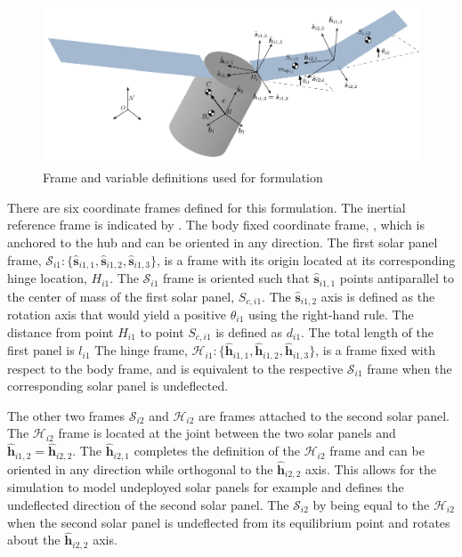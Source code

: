 \documentclass[paper]{aiaaNew}
\begin{document}
	\begin{figure}
		\centering
		\includegraphics[]{Figures/Flex_Slosh_Figure}
		\caption{Frame and variable definitions used for formulation}
		\label{fig:Flex_Slosh_Figure}
	\end{figure} 
	
	There are six coordinate frames defined for this formulation. The inertial reference frame is indicated by . The body fixed coordinate frame, , which is anchored to the hub and can be oriented in any direction. The first solar panel frame, $\mathcal{S}_{i1}:\{\hat{\bm s}_{i1,1},\hat{\bm s}_{i1,2},\hat{\bm s}_{i1,3}\}$, is a frame with its origin located at its corresponding hinge location, $H_{i1}$. The $\mathcal{S}_{i1}$ frame is oriented such that $\hat{\bm{s}}_{i1,1}$ points antiparallel to the center of mass of the first solar panel, $S_{c,i1}$. The $\hat{\bm{s}}_{i1,2}$ axis is defined as the rotation axis that would yield a positive $\theta_{i1}$ using the right-hand rule. The distance from point $H_{i1}$ to point $S_{c,i1}$ is defined as $d_{i1}$. The total length of the first panel is $l_{i1}$ The hinge frame, $\mathcal{H}_{i1}:\{\hat{\bm h}_{i1,1}, \hat{\bm h}_{i1,2}, \hat{\bm h}_{i1,3} \}$, is a frame fixed with respect to the body frame, and is equivalent to the respective $\mathcal{S}_{i1}$ frame when the corresponding solar panel is undeflected.

	The other two frames $\mathcal{S}_{i2}$ and $\mathcal{H}_{i2}$ are frames attached to the second solar panel. The $\mathcal{H}_{i2}$ frame is located at the joint between the two solar panels and $\hat{\bm h}_{i1,2} = \hat{\bm h}_{i2,2}$. The $\hat{\bm h}_{i2,1}$ completes the definition of the $\mathcal{H}_{i2}$ frame and can be oriented in any direction while orthogonal to the $\hat{\bm h}_{i2,2}$ axis. This allows for the simulation to model undeployed solar panels for example and defines the undeflected direction of the second solar panel. The $\mathcal{S}_{i2}$ by being equal to the $\mathcal{H}_{i2}$ when the second solar panel is undeflected from its equilibrium point and rotates about the $\hat{\bm h}_{i2,2}$ axis.
	
\end{document}
